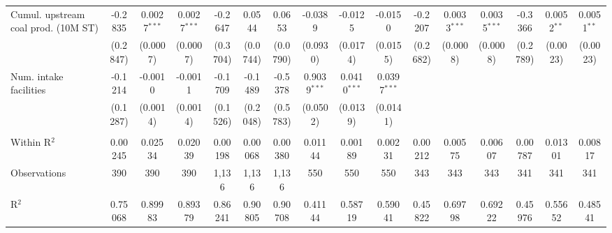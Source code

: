 \begin{table}[htbp]
\begin{adjustbox}{width = \textwidth, center}
\begin{tabular}{lccccccccccccccc}
         \midrule 
         Cumul. upstream coal prod. (10M ST) & -0.2835           & 0.0027$^{***}$     & 0.0027$^{***}$    & -0.2647           & 0.0544             & 0.0653            & -0.0389           & -0.0125            & -0.0150           & -0.2207           & 0.0033$^{***}$     & 0.0035$^{***}$    & -0.3366           & 0.0052$^{**}$      & 0.0051$^{**}$\\   
                                             & (0.2847)          & (0.0007)           & (0.0007)          & (0.3704)          & (0.0744)           & (0.0790)          & (0.0930)          & (0.0174)           & (0.0155)          & (0.2682)          & (0.0008)           & (0.0008)          & (0.2789)          & (0.0023)           & (0.0023)\\   
         Num. intake facilities              & -0.1214           & -0.0010            & -0.0011           & -0.1709           & -0.1489            & -0.5378           & 0.9039$^{***}$    & 0.0410$^{***}$     & 0.0397$^{***}$    &                   &                    &                   &                   &                    &   \\   
                                             & (0.1287)          & (0.0014)           & (0.0014)          & (0.1526)          & (0.2048)           & (0.5783)          & (0.0502)          & (0.0139)           & (0.0141)          &                   &                    &                   &                   &                    &   \\   
         
          \\
         
         Within R$^2$                        & 0.00245           & 0.02534            & 0.02039           & 0.00198           & 0.00068            & 0.00380           & 0.01144           & 0.00189            & 0.00231           & 0.00212           & 0.00575            & 0.00607           & 0.00787           & 0.01301            & 0.00817\\  
         Observations                        & 390               & 390                & 390               & 1,136             & 1,136              & 1,136             & 550               & 550                & 550               & 343               & 343                & 343               & 341               & 341                & 341\\  
         R$^2$                               & 0.75068           & 0.89983            & 0.89379           & 0.86241           & 0.90805            & 0.90708           & 0.41144           & 0.58719            & 0.59041           & 0.45822           & 0.69798            & 0.69222           & 0.45976           & 0.55652            & 0.48541\\  
         

\end{tabular}
\end{adjustbox}
\end{table}
